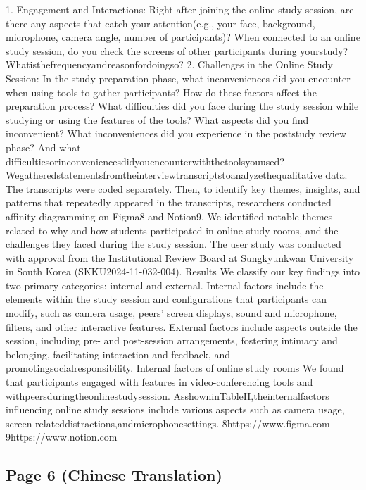 \documentclass[12pt]{ctexart}
\begin{document}
1. Engagement and Interactions: Right after joining the online study session,
are there any aspects that catch your attention(e.g., your face, background,
microphone, camera angle, number of participants)? When connected to an
online study session, do you check the screens of other participants during
yourstudy? Whatisthefrequencyandreasonfordoingso?
2. Challenges in the Online Study Session: In the study preparation phase,
what inconveniences did you encounter when using tools to gather
participants? How do these factors affect the preparation process? What
difficulties did you face during the study session while studying or using the
features of the tools? What aspects did you find inconvenient? What
inconveniences did you experience in the poststudy review phase? And what
difficultiesorinconveniencesdidyouencounterwiththetoolsyouused?
Wegatheredstatementsfromtheinterviewtranscriptstoanalyzethequalitative
data. The transcripts were coded separately. Then, to identify key themes, insights,
and patterns that repeatedly appeared in the transcripts, researchers conducted
affinity diagramming on Figma8 and Notion9. We identified notable themes related
to why and how students participated in online study rooms, and the challenges
they faced during the study session. The user study was conducted with approval
from the Institutional Review Board at Sungkyunkwan University in South Korea
(SKKU2024-11-032-004).
Results
We classify our key findings into two primary categories: internal and external.
Internal factors include the elements within the study session and configurations
that participants can modify, such as camera usage, peers’ screen displays, sound
and microphone, filters, and other interactive features. External factors include
aspects outside the session, including pre- and post-session arrangements,
fostering intimacy and belonging, facilitating interaction and feedback, and
promotingsocialresponsibility.
Internal factors of online study rooms
We found that participants engaged with features in video-conferencing tools and
withpeersduringtheonlinestudysession. AsshowninTableII,theinternalfactors
influencing online study sessions include various aspects such as camera usage,
screen-relateddistractions,andmicrophonesettings.
8https://www.figma.com
9https://www.notion.com

\subsection*{Page 6 (Chinese Translation)}
\end{document}
